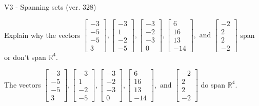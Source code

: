 \begin{exercise}
  \begin{exerciseTitle}V3 - Spanning sets (ver. 328)\end{exerciseTitle}
  \begin{exerciseStatement}
    Explain why the vectors \(\left[\begin{array}{r}
-3 \\
-5 \\
-5 \\
3
\end{array}\right] , \left[\begin{array}{r}
-3 \\
1 \\
-2 \\
-5
\end{array}\right] , \left[\begin{array}{r}
-3 \\
-2 \\
-3 \\
0
\end{array}\right] , \left[\begin{array}{r}
6 \\
16 \\
13 \\
-14
\end{array}\right] , \text{ and } \left[\begin{array}{r}
-2 \\
2 \\
2 \\
-2
\end{array}\right]\) span or don't span \(\mathbb{R}^4\). 
	


  \end{exerciseStatement}
  \begin{exerciseAnswer}
   The vectors \(\left[\begin{array}{r}
-3 \\
-5 \\
-5 \\
3
\end{array}\right] , \left[\begin{array}{r}
-3 \\
1 \\
-2 \\
-5
\end{array}\right] , \left[\begin{array}{r}
-3 \\
-2 \\
-3 \\
0
\end{array}\right] , \left[\begin{array}{r}
6 \\
16 \\
13 \\
-14
\end{array}\right] , \text{ and } \left[\begin{array}{r}
-2 \\
2 \\
2 \\
-2
\end{array}\right]\) 
  	 do  
	span \(\mathbb{R}^4\).
  



\end{exerciseAnswer}
\end{exercise}
